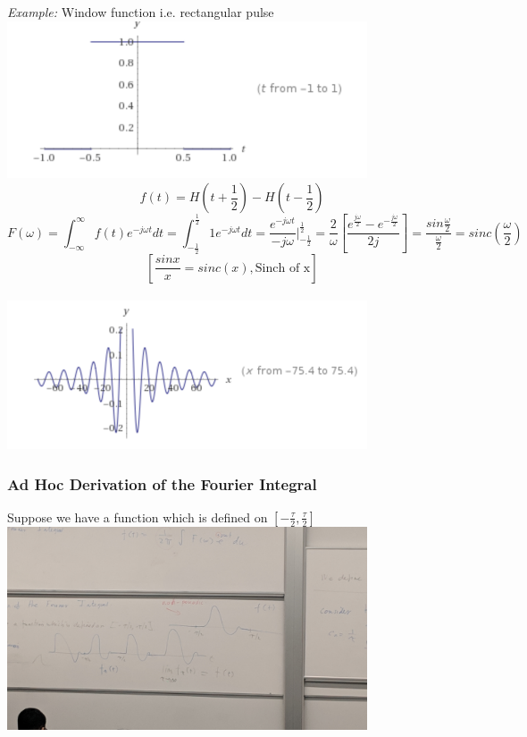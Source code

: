 \documentclass[11pt]{article}
\theoremstyle{definition}
\begin{document}
\textit{Example:}
Window function i.e. rectangular pulse\\
\includegraphics[width=0.8\textwidth]{windowfunction.png}\\
$$f(t) = H(t+\frac{1}{2}) - H(t-\frac{1}{2})$$
$$F(\omega) = \int^{\infty}_{-\infty} f(t) e^{-j\omega t}dt = \int_{-\frac{1}{2}}^{\frac{1}{2}}1e^{-j\omega t}dt = \frac{e^{-j\omega t}}{-j \omega}|^\frac{1}{2}_{-\frac{1}{2}} = \frac{2}{\omega}[\frac{e^{\frac{j\omega}{2}} - e^{-\frac{j\omega}{2}}}{2j}] = \frac{sin \frac{\omega}{2}}{\frac{\omega }{2}} = sinc(\frac{\omega}{2})$$
$$[\frac{sinx}{x} = sinc(x), \text{Sinch of x}]$$\\
\includegraphics[width=0.8\textwidth]{sincx.png}\\

\subsubsection{Ad Hoc Derivation of the Fourier Integral}
Suppose we have a function which is defined on $[-\frac{\tau}{2}, \frac{\tau}{2}]$
\\
\includegraphics[width=0.8\textwidth]{non-periodic.jpeg}\\
\end{document}
